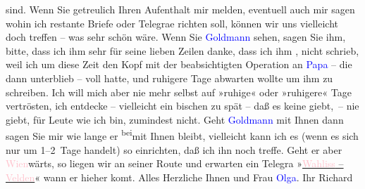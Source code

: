                sind.\pend
           \pstart
           {\pb}Wenn Sie getreulich Ihren
               Aufenthalt mir melden, eventuell auch mir sagen wohin ich restante Briefe oder
                  Telegra{\geminationm}e richten soll, können wir uns vielleicht doch treffen – was sehr schön wäre.\pend
           \pstart
           {\pb}Wenn Sie \textcolor{blue}{Goldmann}{}\ledrightnote{\textcolor{blue}{Paul Goldmann}} sehen, sagen Sie ihm, bitte, dass ich ihm sehr für
               seine lieben Zeilen danke, dass ich ihm \label{K_L01701-1v}\label{K_L01701-1h}, nicht schrieb,
               weil ich um diese Zeit den Kopf mit der beabsichtigten Operation an \textcolor{blue}{Papa}{} – die dann unterblieb – voll hatte, und
               ruhigere Tage abwarten wollte um ihm zu schreiben. Ich will mich aber nie mehr selbst
               auf »ruhige« oder »ruhigere« Tage vertrösten, ich {\pb}entdecke – vielleicht ein bischen
               zu spät – daß es keine giebt, – nie giebt, für Leute wie ich bin, zumindest
               nicht.\pend
           \pstart
           Geht \textcolor{blue}{Goldmann}{}\ledrightnote{\textcolor{blue}{Paul Goldmann}} mit Ihnen dann sagen Sie mir wie
               lange er \substVorne{}\textsuperscript{bei}\substDazwischen{}mit\substHinten{} Ihnen bleibt, vielleicht kann ich es (wenn {\pb}es sich nur um 1–2 Tage handelt) so
               einrichten, daß ich ihn noch treffe. Geht er aber \textcolor{pink}{Wien}{}\ledrightnote{\textcolor{pink}{Wien}}wärts, so liegen wir an seiner Route und erwarten ein Telegra{\geminationm} »\uline{\textcolor{pink}{Wahliss}{}\ledrightnote{\textcolor{pink}{Etablissement Ernst Wahliss}} – \textcolor{pink}{Velden}{}\ledrightnote{\textcolor{pink}{Velden}}}« wann
               er hieher ko{\geminationm}mt. Alles Herzliche Ihnen und Frau \textcolor{blue}{Olga}{}\ledrightnote{\textcolor{blue}{Olga Schnitzler}}.\pend
           \pstart Ihr \spacefill\mbox{Richard}\pend{}\endnumbering{}  
      